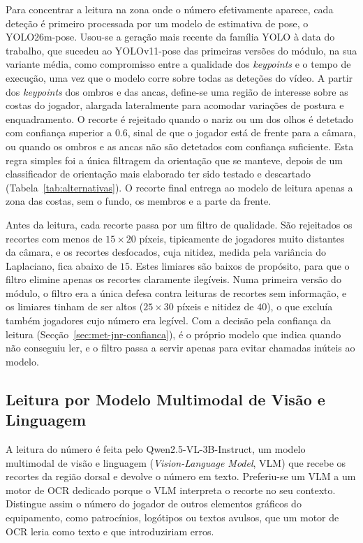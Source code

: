 Para concentrar a leitura na zona onde o número efetivamente aparece, cada deteção é primeiro processada por um modelo de estimativa de pose, o YOLO26m-pose. Usou-se a geração mais recente da família YOLO à data do trabalho, que sucedeu ao YOLOv11-pose das primeiras versões do módulo, na sua variante média, como compromisso entre a qualidade dos \emph{keypoints} e o tempo de execução, uma vez que o modelo corre sobre todas as deteções do vídeo. A partir dos \emph{keypoints} dos ombros e das ancas, define-se uma região de interesse sobre as costas do jogador, alargada lateralmente para acomodar variações de postura e enquadramento. O recorte é rejeitado quando o nariz ou um dos olhos é detetado com confiança superior a $0.6$, sinal de que o jogador está de frente para a câmara, ou quando os ombros e as ancas não são detetados com confiança suficiente. Esta regra simples foi a única filtragem da orientação que se manteve, depois de um classificador de orientação mais elaborado ter sido testado e descartado (Tabela~\ref{tab:alternativas}). O recorte final entrega ao modelo de leitura apenas a zona das costas, sem o fundo, os membros e a parte da frente.

Antes da leitura, cada recorte passa por um filtro de qualidade. São rejeitados os recortes com menos de $15\times20$ píxeis, tipicamente de jogadores muito distantes da câmara, e os recortes desfocados, cuja nitidez, medida pela variância do Laplaciano, fica abaixo de $15$. Estes limiares são baixos de propósito, para que o filtro elimine apenas os recortes claramente ilegíveis. Numa primeira versão do módulo, o filtro era a única defesa contra leituras de recortes sem informação, e os limiares tinham de ser altos ($25\times30$ píxeis e nitidez de $40$), o que excluía também jogadores cujo número era legível. Com a decisão pela confiança da leitura (Secção~\ref{sec:met-jnr-confianca}), é o próprio modelo que indica quando não conseguiu ler, e o filtro passa a servir apenas para evitar chamadas inúteis ao modelo.


\subsection{Leitura por Modelo Multimodal de Visão e Linguagem}

A leitura do número é feita pelo Qwen2.5-VL-3B-Instruct, um modelo multimodal de visão e linguagem (\emph{Vision-Language Model}, VLM) que recebe os recortes da região dorsal e devolve o número em texto. Preferiu-se um VLM a um motor de OCR dedicado porque o VLM interpreta o recorte no seu contexto. Distingue assim o número do jogador de outros elementos gráficos do equipamento, como patrocínios, logótipos ou textos avulsos, que um motor de OCR leria como texto e que introduziriam erros.

